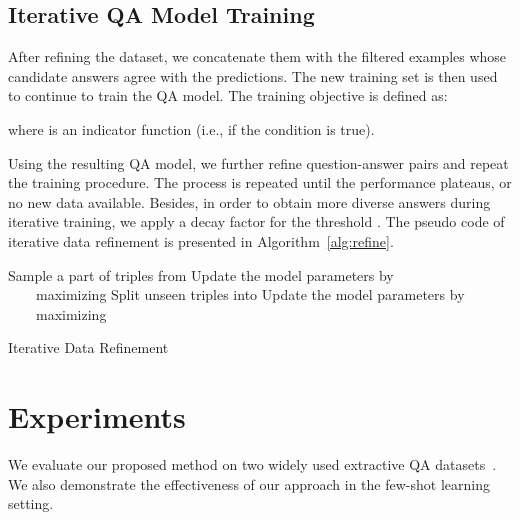 \documentclass[11pt,a4paper]{article}
\begin{document}
\subsection{Iterative QA Model Training}

After refining the dataset, we concatenate them with the filtered examples whose candidate answers agree with the predictions.
The new training set is then used to continue to train the QA model.
The training objective is defined as:

where  is an indicator function (i.e.,  if the condition is true).


Using the resulting QA model, we further refine question-answer pairs and repeat the training procedure.
The process is repeated until the performance plateaus, or no new data available.
Besides, in order to obtain more diverse answers during iterative training, we apply a decay factor  for the threshold .
The pseudo code of iterative data refinement is presented in Algorithm~\ref{alg:refine}.







\begin{algorithm}[t]
\SetAlgoNoLine
\DontPrintSemicolon
{}
Sample a part of triples  from \;
Update the model parameters by \\ ~~~~maximizing \;
Split unseen triples into \;
 {
    \;
    \;
    Update the model parameters by \\ ~~~~maximizing \;
}
\caption{Iterative Data Refinement}
\label{alg:refine}
\end{algorithm}



\section{Experiments}

We evaluate our proposed method on two widely used extractive QA datasets~\citep{squad1,newsqa2017}.
We also demonstrate the effectiveness of our approach in the few-shot learning setting.
\end{document}

